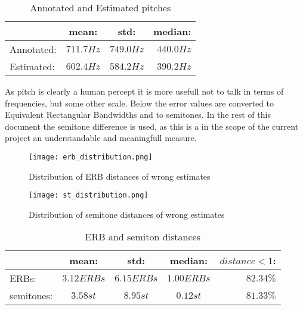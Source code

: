 \documentclass{article}
\begin{document}
\begin{table}[h]
    \begin{center}
        \begin{tabular}{ | l | c | c | r |}
            \hline
                        &   mean:       &   std:        &   median:     \\  \hline
            Annotated:  &   $711.7Hz$   &   $749.0Hz$   &   $440.0Hz$   \\  \hline
            Estimated:  &   $602.4Hz$   &   $584.2Hz$   &   $390.2Hz$   \\  
            \hline
        \end{tabular}
        \caption{Annotated and Estimated pitches}
        \label{table:pTag_pEst}
    \end{center}
\end{table}
As pitch is clearly a human percept it is more usefull not to talk in terms of frequencies, but some other scale. Below the error values are converted to Equivalent Rectangular Bandwidths and to semitones. In the rest of this document the semitone difference is used, as this is a in the scope of the current project an understandable and meaningfull measure. 

\begin{figure}
    \centering
    \texttt{[image: erb\_distribution.png]}
    \caption{Distribution of ERB distances of wrong estimates}
    \label{fig:erb_distr}
\end{figure}

\begin{figure}
    \centering
    \texttt{[image: st\_distribution.png]}
    \caption{Distribution of semitone distances of wrong estimates}
    \label{fig:st_distr}
\end{figure}

\begin{table}[h]
    \begin{center}
        \begin{tabular}{ | l | c | c | c || r |}
            \hline
                        &   mean:       &   std:        &   median:     &   $distance < 1$:\\  \hline
            ERBs:       &   $3.12ERBs$  &   $6.15ERBs$  &   $1.00ERBs$  &   $82.34\%$   \\  \hline
            semitones:  &   $3.58st$    &   $8.95st$    &   $0.12st$    &   $81.33\%$   \\  
            \hline
        \end{tabular}
        \caption{ERB and semiton distances}
        \label{table:ERB_st}
    \end{center}
\end{table}
\end{document}
